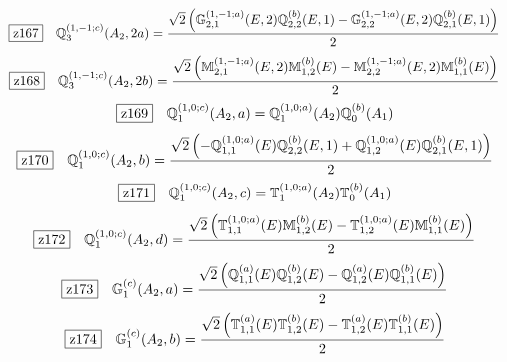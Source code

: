 \documentclass[fleqn,10pt,landscape]{jsarticle}
\begin{document}
\begin{dmath*}
\hspace*{3mm}\fbox{z167}\quad \mathbb{Q}_{3}^{(1,-1;c)}(A_{2},2a)=\frac{\sqrt{2} \left(\mathbb{G}_{2,1}^{(1,-1;a)}(E,2) \mathbb{Q}_{2,2}^{(b)}(E,1) - \mathbb{G}_{2,2}^{(1,-1;a)}(E,2) \mathbb{Q}_{2,1}^{(b)}(E,1)\right)}{2}
\end{dmath*}
\begin{dmath*}
\hspace*{3mm}\fbox{z168}\quad \mathbb{Q}_{3}^{(1,-1;c)}(A_{2},2b)=\frac{\sqrt{2} \left(\mathbb{M}_{2,1}^{(1,-1;a)}(E,2) \mathbb{M}_{1,2}^{(b)}(E) - \mathbb{M}_{2,2}^{(1,-1;a)}(E,2) \mathbb{M}_{1,1}^{(b)}(E)\right)}{2}
\end{dmath*}
\begin{dmath*}
\hspace*{3mm}\fbox{z169}\quad \mathbb{Q}_{1}^{(1,0;c)}(A_{2},a)=\mathbb{Q}_{1}^{(1,0;a)}(A_{2}) \mathbb{Q}_{0}^{(b)}(A_{1})
\end{dmath*}
\begin{dmath*}
\hspace*{3mm}\fbox{z170}\quad \mathbb{Q}_{1}^{(1,0;c)}(A_{2},b)=\frac{\sqrt{2} \left(- \mathbb{Q}_{1,1}^{(1,0;a)}(E) \mathbb{Q}_{2,2}^{(b)}(E,1) + \mathbb{Q}_{1,2}^{(1,0;a)}(E) \mathbb{Q}_{2,1}^{(b)}(E,1)\right)}{2}
\end{dmath*}
\begin{dmath*}
\hspace*{3mm}\fbox{z171}\quad \mathbb{Q}_{1}^{(1,0;c)}(A_{2},c)=\mathbb{T}_{1}^{(1,0;a)}(A_{2}) \mathbb{T}_{0}^{(b)}(A_{1})
\end{dmath*}
\begin{dmath*}
\hspace*{3mm}\fbox{z172}\quad \mathbb{Q}_{1}^{(1,0;c)}(A_{2},d)=\frac{\sqrt{2} \left(\mathbb{T}_{1,1}^{(1,0;a)}(E) \mathbb{M}_{1,2}^{(b)}(E) - \mathbb{T}_{1,2}^{(1,0;a)}(E) \mathbb{M}_{1,1}^{(b)}(E)\right)}{2}
\end{dmath*}
\begin{dmath*}
\hspace*{3mm}\fbox{z173}\quad \mathbb{G}_{1}^{(c)}(A_{2},a)=\frac{\sqrt{2} \left(\mathbb{Q}_{1,1}^{(a)}(E) \mathbb{Q}_{1,2}^{(b)}(E) - \mathbb{Q}_{1,2}^{(a)}(E) \mathbb{Q}_{1,1}^{(b)}(E)\right)}{2}
\end{dmath*}
\begin{dmath*}
\hspace*{3mm}\fbox{z174}\quad \mathbb{G}_{1}^{(c)}(A_{2},b)=\frac{\sqrt{2} \left(\mathbb{T}_{1,1}^{(a)}(E) \mathbb{T}_{1,2}^{(b)}(E) - \mathbb{T}_{1,2}^{(a)}(E) \mathbb{T}_{1,1}^{(b)}(E)\right)}{2}
\end{dmath*}
\end{document}
